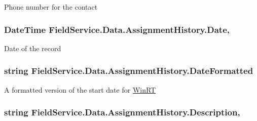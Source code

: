 Phone number for the contact 

\hypertarget{class_field_service_1_1_data_1_1_assignment_history_a3cb0d9bf3982881b97c5a5e9a7893e31}{
\subsubsection[{Date}]{\setlength{\rightskip}{0pt plus 5cm}Date\+Time Field\+Service.\+Data.\+Assignment\+History.\+Date\hspace{0.3cm}{\ttfamily [get]}, {\ttfamily [set]}}}\label{class_field_service_1_1_data_1_1_assignment_history_a3cb0d9bf3982881b97c5a5e9a7893e31}


Date of the record 

\hypertarget{class_field_service_1_1_data_1_1_assignment_history_a9dfa58e8e679688e455eabb8491b239e}{
\subsubsection[{Date\+Formatted}]{\setlength{\rightskip}{0pt plus 5cm}string Field\+Service.\+Data.\+Assignment\+History.\+Date\+Formatted\hspace{0.3cm}{\ttfamily [get]}}}\label{class_field_service_1_1_data_1_1_assignment_history_a9dfa58e8e679688e455eabb8491b239e}


A formatted version of the start date for \hyperlink{namespace_field_service_1_1_win_r_t}{Win\+R\+T} 

\hypertarget{class_field_service_1_1_data_1_1_assignment_history_a36b09d038bd956bc43707627a9b27527}{
\subsubsection[{Description}]{\setlength{\rightskip}{0pt plus 5cm}string Field\+Service.\+Data.\+Assignment\+History.\+Description\hspace{0.3cm}{\ttfamily [get]}, {\ttfamily [set]}}}\label{class_field_service_1_1_data_1_1_assignment_history_a36b09d038bd956bc43707627a9b27527}


